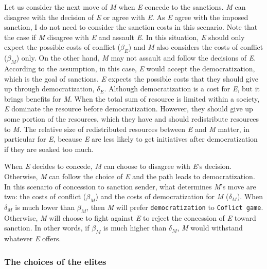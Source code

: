 \documentclass[11pt]{article}
\begin{document}
Let us consider the next move of \textit{M} when \textit{E} concede to the sanctions. \textit{M} can disagree with the decision of \textit{E} or agree with \textit{E}. As \textit{E} agree with the imposed sanction, I do not need to consider the sanction costs in this scenario. Note that the case if \textit{M} disagree with \textit{E} and assault \textit{E}. In this situation, \textit{E} should only expect the possible costs of conflict ($\beta_{E}$) and \textit{M} also considers the costs of conflict ($\beta_{M}$) only. On the other hand, \textit{M} may not assault and follow the decisions of \textit{E}. According to the assumption, in this case, \textit{E} would accept the democratization, which is the goal of sanctions. \textit{E} expects the possible costs that they should give up through democratization, $\delta_{E}$. Although democratization is a cost for \textit{E}, but it brings benefits for \textit{M}. When the total sum of resource is limited within a society, \textit{E} dominate the resource before democratization. However, they should give up some portion of the resources, which they have and should redistribute resources to \textit{M}. The relative size of redistributed resources between \textit{E} and \textit{M} matter, in particular for \textit{E}, because \textit{E} are less likely to get initiatives after democratization if they are soaked too much. 

When \textit{E} decides to concede, \textit{M} can choose to disagree with \textit{E}'s decision. Otherwise, \textit{M} can follow the choice of \textit{E} and the path leads to democratization. In this scenario of concession to sanction sender, what determines \textit{M}'s move are two: the costs of conflict ($\beta_{M}$) and the costs of democratization for \textit{M} ($\delta_{M}$). When $\delta_{M}$ is much lower than $\beta_{M}$, then \textit{M} will prefer \texttt{democratization} to \texttt{Coflict game}. Otherwise, \textit{M} will choose to fight against \textit{E} to reject the concession of \textit{E} toward sanction. In other words, if $\beta_{M}$ is much higher than $\delta_{M}$, \textit{M} would withstand whatever \textit{E} offers.
	
\subsubsection*{The choices of the elites}
\end{document}
